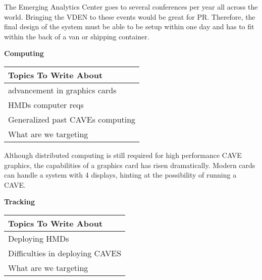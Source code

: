 	The Emerging Analytics Center goes to several conferences per year all across the world. Bringing the VDEN to these events would be great for PR. Therefore, the final design of the system must be able to be setup within one day and has to fit within the back of a van or shipping container.

\filbreak
\noindent\textbf{Computing}\\
    \begin{center}
        \begin{table}[H]
            \centering
            \renewcommand\arraystretch{0.5}
            \begin{tabular}{|l|}
                \hline 
                Topics To Write About \\ 
                \hline 
                advancement in graphics cards \\  
                HMDs computer reqs \\  
                Generalized past CAVEs computing  \\
                What are we targeting \\
                \hline 
            \end{tabular}
        \end{table}
    \end{center}
    
	Although distributed computing is still required for high performance CAVE graphics, the capabilities of a graphics card has risen dramatically. Modern cards can handle a system with 4 displays, hinting at the possibility of running a CAVE.

\filbreak
\noindent\textbf{Tracking}\\
    \begin{center}
        \begin{table}[H]
            \centering
            \renewcommand\arraystretch{0.5}
            \begin{tabular}{|l|}
                \hline 
                Topics To Write About \\ 
                \hline 
                Deploying HMDs \\  
                Difficulties in deploying CAVES  \\
                What are we targeting \\
                \hline 
            \end{tabular}
        \end{table}
    \end{center}
    
